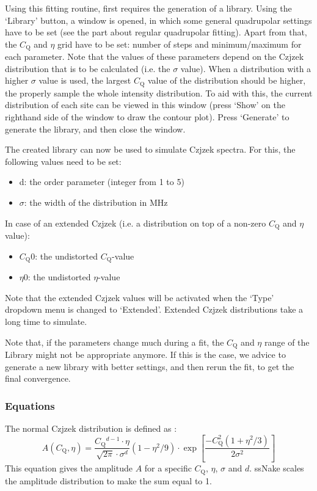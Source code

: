 \documentclass[11pt,a4paper]{article}
\begin{document}
Using this fitting routine, first requires the generation of a library. Using the `Library'
button, a window is opened, in which some general quadrupolar settings have to be set (see the part
about regular quadrupolar fitting). Apart from that, the $C_\text{Q}$ and $\eta$ grid have to be
set: number of steps and minimum/maximum for each parameter. Note that the values of these parameters
depend on the Czjzek distribution that is to be calculated (i.e. the $\sigma$ value). When a
distribution with a higher $\sigma$ value is used, the largest $C_\text{Q}$ value of the distribution
should be higher, the properly sample the whole intensity distribution. To aid with this, the
current distribution of each site can be viewed in this window (press `Show' on the righthand side
of the window to draw the contour plot). Press `Generate' to generate the library, and then close
the window.

The created library can now be used to simulate Czjzek spectra. For this, the following values need
to be set:

\begin{itemize}
\item d: the order parameter (integer from 1 to 5)
\item $\sigma$: the width of the distribution in MHz
\end{itemize}
In case of an extended Czjzek (i.e. a distribution on top of a non-zero $C_\text{Q}$ and $\eta$
value):
\begin{itemize}
  \item $C_\text{Q}0$: the undistorted $C_\text{Q}$-value
  \item $\eta0$: the undistorted $\eta$-value
\end{itemize}
Note that the extended Czjzek values will be activated when the `Type' dropdown menu is changed to
`Extended'. Extended Czjzek distributions take a long time to simulate. 

Note that, if the parameters change much during a fit, the $C_\text{Q}$ and $\eta$ range of the
Library might not be appropriate anymore. If this is the case, we advice to generate a new library
with better settings, and then rerun the fit, to get the final convergence.


\subsubsection*{Equations}

The normal Czjzek distribution is defined as \cite{Grimminck2011Easy}:
\begin{equation}
  A(C_\text{Q},\eta) = \frac{C_\text{Q}{}^{d - 1} \cdot \eta}{\sqrt{2\pi} \cdot \sigma^d} (1 - \eta^2 / 9) \cdot
  \exp\left[\frac{-C_\text{Q}^2 (1 + \eta^2/3)} {2\sigma^2}   \right]
\end{equation}
This equation gives the amplitude $A$ for a specific $C_\text{Q}$, $\eta$, $\sigma$ and $d$. ssNake
scales the amplitude distribution to make the sum equal to 1.
\end{document}
